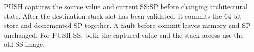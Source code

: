 PUSH captures the source value and current SS:SP before changing architectural state. After the destination stack slot has been validated, it commits the 64-bit store and decremented SP together. A fault before commit leaves memory and SP unchanged. For PUSH SS, both the captured value and the stack access use the old SS image.
